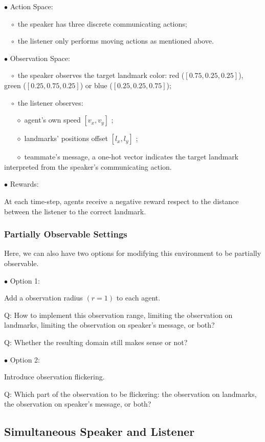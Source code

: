\documentclass{article}
\begin{document}
$\bullet$ Action Space:

$\,\,\,\,\,\circ$ the speaker has three discrete communicating actions;

$\,\,\,\,\,\circ$ the listener only performs moving actions as mentioned above.

$\bullet$ Observation Space:

$\,\,\,\,\,\circ$ the speaker observes the target landmark color: red ($[0.75, 0.25, 0.25]$), green ($[0.25, 0.75, 0.25]$) or blue ($[0.25, 0.25, 0.75]$);

$\,\,\,\,\,\circ$ the listener observes:

$\,\,\,\,\,\,\,\,\,\,\diamond$ agent's own speed $[v_x, v_y]$ ;

$\,\,\,\,\,\,\,\,\,\,\diamond$ landmarks' positions offset $[l_x, l_y]$ ;

$\,\,\,\,\,\,\,\,\,\,\diamond$ teammate's message, a one-hot vector indicates the target landmark interpreted from the speaker's communicating action.

$\bullet$ Rewards:

At each time-step, agents receive a negative reward respect to the distance between the listener to the correct landmark.

\subsubsection{Partially Observable Settings}

Here, we can also have two options for modifying this environment to be partially observable.

$\bullet$ Option 1: 

Add a observation radius $(r=1)$ to each agent.

{\color{red} Q: How to implement this observation range, limiting the observation on landmarks, limiting the observation on speaker's message, or both?}

{\color{red} Q: Whether the resulting domain still makes sense or not?}

$\bullet$ Option 2:

Introduce observation flickering.

{\color{red} Q: Which part of the observation to be flickering: the observation on landmarks, the observation on speaker's message, or both?}

\subsection{Simultaneous Speaker and Listener}
\end{document}
